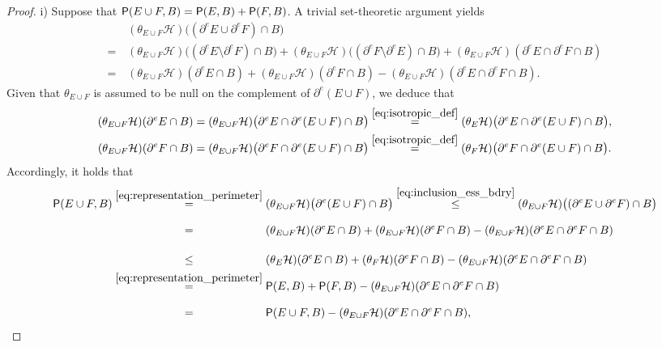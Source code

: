 \documentclass[reqno]{amsart}
\numberwithin{equation}{section}
\newcommand{\1}{\mathbbm 1}
\renewcommand{\P}{{\sf P}}
\renewcommand{\H}{{\mathcal H}}
\begin{document}
\begin{proof} {\color{blue}i)} Suppose that \(\P(E\cup F,B)=\P(E,B)+\P(F,B)\).
A trivial set-theoretic argument yields
\[\begin{split}
&(\theta_{E\cup F}\H)\big((\partial^e E\cup\partial^e F)\cap B\big)\\
=\,&(\theta_{E\cup F}\H)\big((\partial^e E\setminus\partial^e F)\cap B\big)+
(\theta_{E\cup F}\H)\big((\partial^e F\setminus\partial^e E)\cap B\big)+
(\theta_{E\cup F}\H)(\partial^e E\cap\partial^e F\cap B)\\
=\,&(\theta_{E\cup F}\H)(\partial^e E\cap B)+(\theta_{E\cup F}\H)(\partial^e F\cap B)-
(\theta_{E\cup F}\H)(\partial^e E\cap\partial^e F\cap B).
\end{split}\]
Given that \(\theta_{E\cup F}\) is assumed to be null on the complement of
\(\partial^e(E\cup F)\), we deduce that
\[\begin{split}
(\theta_{E\cup F}\H)(\partial^e E\cap B)&=
(\theta_{E\cup F}\H)\big(\partial^e E\cap\partial^e(E\cup F)\cap B\big)
\overset{\eqref{eq:isotropic_def}}=
(\theta_E\H)\big(\partial^e E\cap\partial^e(E\cup F)\cap B\big),\\
(\theta_{E\cup F}\H)(\partial^e F\cap B)&=
(\theta_{E\cup F}\H)\big(\partial^e F\cap\partial^e(E\cup F)\cap B\big)
\overset{\eqref{eq:isotropic_def}}=
(\theta_F\H)\big(\partial^e F\cap\partial^e(E\cup F)\cap B\big).
\end{split}\]
Accordingly, it holds that
\[\begin{split}
\P(E\cup F,B)&\overset{\eqref{eq:representation_perimeter}}=
(\theta_{E\cup F}\H)\big(\partial^e(E\cup F)\cap B\big)
\overset{\eqref{eq:inclusion_ess_bdry}}\leq
(\theta_{E\cup F}\H)\big((\partial^e E\cup\partial^e F)\cap B\big)\\
&\overset{\phantom{\eqref{eq:representation_perimeter}}}=
(\theta_{E\cup F}\H)(\partial^e E\cap B)+(\theta_{E\cup F}\H)(\partial^e F\cap B)
-(\theta_{E\cup F}\H)(\partial^e E\cap\partial^e F\cap B)\\
&\overset{\phantom{\eqref{eq:representation_perimeter}}}\leq
(\theta_E\H)(\partial^e E\cap B)+(\theta_F\H)(\partial^e F\cap B)
-(\theta_{E\cup F}\H)(\partial^e E\cap\partial^e F\cap B)\\
&\overset{\eqref{eq:representation_perimeter}}=
\P(E,B)+\P(F,B)-(\theta_{E\cup F}\H)(\partial^e E\cap\partial^e F\cap B)\\
&\overset{\phantom{\eqref{eq:representation_perimeter}}}=
\P(E\cup F,B)-(\theta_{E\cup F}\H)(\partial^e E\cap\partial^e F\cap B),
\end{split}\]

\end{proof}
\end{document}
